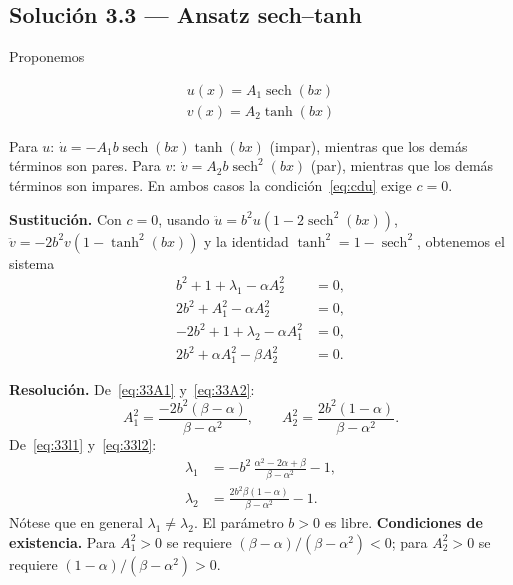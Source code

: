 \documentclass[letterpaper,11pt]{exam}
\theoremstyle{plain}
\begin{document}
\subsection{Solución 3.3 — Ansatz sech--tanh}
\label{sec:sol33}

Proponemos

\begin{align*}
     u(x) = A_1\operatorname{sech}(bx) \\
     v(x) = A_2\tanh(bx)
\end{align*}

Para $u$: $\dot{u} = -A_1 b\operatorname{sech}(bx)\tanh(bx)$ (impar), mientras que los demás
términos  son pares. Para $v$: $\dot{v} = A_2 b\operatorname{sech}^2(bx)$
(par), mientras que los demás términos son impares. En ambos casos la condición~\eqref{eq:cdu}
exige $c=0$.

\medskip
\noindent\textbf{Sustitución.} Con $c=0$, usando
$\ddot{u} = b^2u(1-2\operatorname{sech}^2(bx))$,
$\ddot{v} = -2b^2v(1-\tanh^2(bx))$
y la identidad $\tanh^2 = 1-\operatorname{sech}^2$, obtenemos el sistema
\begin{align}
    b^2 + 1 + \lambda_1 - \alpha A_2^2 &= 0, \label{eq:33l1}\\
    2b^2 + A_1^2 - \alpha A_2^2 &= 0, \label{eq:33A1}\\
    -2b^2 + 1 + \lambda_2 - \alpha A_1^2 &= 0, \label{eq:33l2}\\
    2b^2 + \alpha A_1^2 - \beta A_2^2 &= 0. \label{eq:33A2}
\end{align}

\noindent\textbf{Resolución.} De~\eqref{eq:33A1} y~\eqref{eq:33A2}:
\begin{equation}
    A_1^2 = \frac{-2b^2(\beta-\alpha)}{\beta-\alpha^2}, \qquad
    A_2^2 = \frac{2b^2(1-\alpha)}{\beta-\alpha^2}.
    \label{eq:33amps}
\end{equation}
De~\eqref{eq:33l1} y~\eqref{eq:33l2}:
\begin{align}
    \lambda_1 &= -b^2\,\frac{\alpha^2-2\alpha+\beta}{\beta-\alpha^2} - 1, \label{eq:33lam1}\\
    \lambda_2 &= \frac{2b^2\beta(1-\alpha)}{\beta-\alpha^2} - 1. \label{eq:33lam2}
\end{align}
Nótese que en general $\lambda_1\neq\lambda_2$. El parámetro $b>0$ es libre. \textbf{Condiciones de existencia.} Para $A_1^2>0$ se requiere
$(\beta-\alpha)/(\beta-\alpha^2)<0$; para $A_2^2>0$ se requiere
$(1-\alpha)/(\beta-\alpha^2)>0$.
\end{document}
